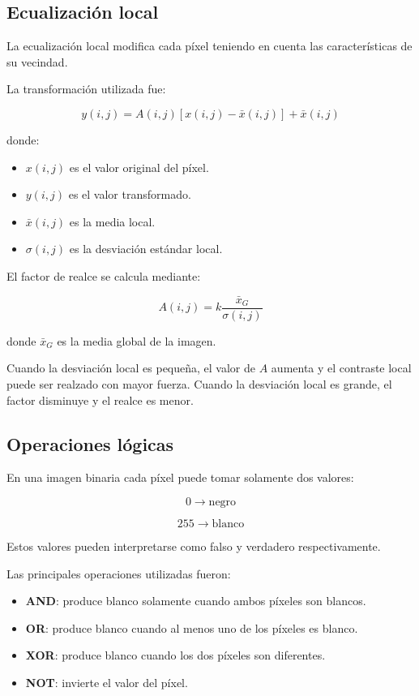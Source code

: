 \documentclass[11pt,letterpaper]{article}
\begin{document}
\subsection{Ecualización local}

La ecualización local modifica cada píxel teniendo en cuenta las características de su vecindad.

La transformación utilizada fue:

\[
y(i,j)
=
A(i,j)
\left[
x(i,j)-\bar{x}(i,j)
\right]
+
\bar{x}(i,j)
\]

donde:

\begin{itemize}
    \item $x(i,j)$ es el valor original del píxel.
    \item $y(i,j)$ es el valor transformado.
    \item $\bar{x}(i,j)$ es la media local.
    \item $\sigma(i,j)$ es la desviación estándar local.
\end{itemize}

El factor de realce se calcula mediante:

\[
A(i,j)
=
k\frac{\bar{x}_G}{\sigma(i,j)}
\]

donde $\bar{x}_G$ es la media global de la imagen.

Cuando la desviación local es pequeña, el valor de $A$ aumenta y el contraste local puede ser realzado con mayor fuerza. Cuando la desviación local es grande, el factor disminuye y el realce es menor.


\subsection{Operaciones lógicas}

En una imagen binaria cada píxel puede tomar solamente dos valores:

\[
0 \rightarrow \text{negro}
\]

\[
255 \rightarrow \text{blanco}
\]

Estos valores pueden interpretarse como falso y verdadero respectivamente.

Las principales operaciones utilizadas fueron:

\begin{itemize}
    \item \textbf{AND}: produce blanco solamente cuando ambos píxeles son blancos.
    \item \textbf{OR}: produce blanco cuando al menos uno de los píxeles es blanco.
    \item \textbf{XOR}: produce blanco cuando los dos píxeles son diferentes.
    \item \textbf{NOT}: invierte el valor del píxel.
\end{itemize}
\end{document}
